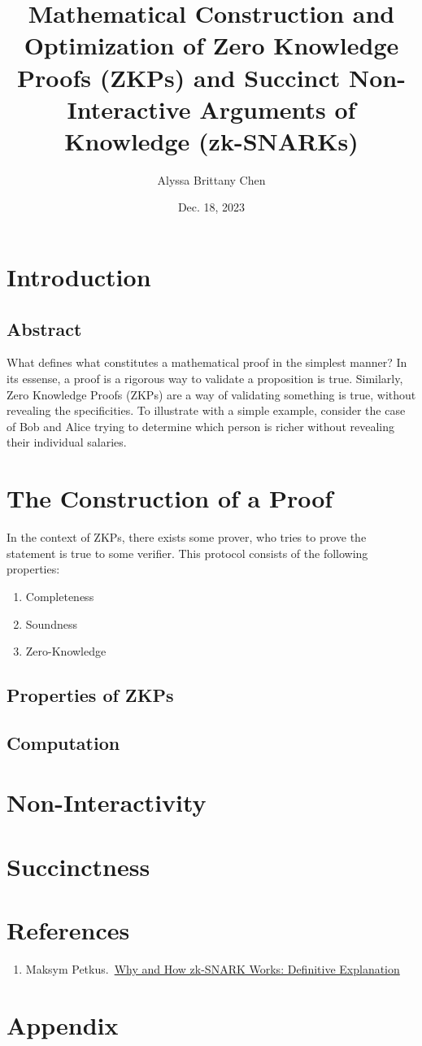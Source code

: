 \documentclass[12pt]{article}
\title{Mathematical Construction and Optimization of Zero Knowledge Proofs (ZKPs) and Succinct Non-Interactive Arguments of Knowledge (zk-SNARKs) }
\author{Alyssa Brittany Chen}
\date{Dec. 18, 2023}
\begin{document}
\maketitle


\tableofcontents

\newpage

\section{Introduction}

\subsection{Abstract}
What defines what constitutes a mathematical proof in the simplest manner? In its essense, a proof is a rigorous way to validate a proposition is true. Similarly, Zero Knowledge Proofs (ZKPs) are a way of validating something is true, without revealing the specificities. To illustrate with a simple example, consider the case of Bob and Alice trying to determine which person is richer without revealing their individual salaries.

\section{The Construction of a Proof}
In the context of ZKPs, there exists some prover, who tries to prove the statement is true to some verifier. This protocol consists of the following properties:
\begin{enumerate}
    \item Completeness
    \item Soundness
    \item Zero-Knowledge
\end{enumerate}
\subsection{Properties of ZKPs}
\subsection{Computation}

\section{Non-Interactivity}

\section{Succinctness}


\section*{References}
\begin{enumerate}
    \renewcommand{\labelenumi}{[\Alph{enumi}]}
    \item Maksym Petkus.\ \href{https://arxiv.org/pdf/1906.07221.pdf}{Why and How zk-SNARK Works: Definitive Explanation}
\end{enumerate}

\appendix
\section{Appendix}
\end{document}
